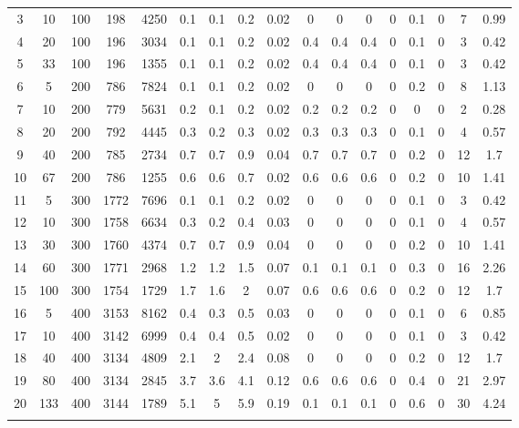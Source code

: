 \documentclass[11pt]{article}
\newcommand{\np}{\newpage}
\begin{document}
\begin{appendices}
\begin{landscape}
\begin{longtable}[c]{ccccc|cccc|cccc|cccc}
				\rowcolor[HTML]{EFEFEF} 
				3 & 10 & 100 & 198 & 4250 & 0.1 & 0.1 & 0.2 & 0.02 & 0 & 0 & 0 & 0 & 0.1 & 0 & 7 & 0.99 \\
				\rowcolor[HTML]{EFEFEF} 
				4 & 20 & 100 & 196 & 3034 & 0.1 & 0.1 & 0.2 & 0.02 & 0.4 & 0.4 & 0.4 & 0 & 0.1 & 0 & 3 & 0.42 \\
				\rowcolor[HTML]{EFEFEF} 
				5 & 33 & 100 & 196 & 1355 & 0.1 & 0.1 & 0.2 & 0.02 & 0.4 & 0.4 & 0.4 & 0 & 0.1 & 0 & 3 & 0.42 \\
				6 & 5 & 200 & 786 & 7824 & 0.1 & 0.1 & 0.2 & 0.02 & 0 & 0 & 0 & 0 & 0.2 & 0 & 8 & 1.13 \\
				7 & 10 & 200 & 779 & 5631 & 0.2 & 0.1 & 0.2 & 0.02 & 0.2 & 0.2 & 0.2 & 0 & 0 & 0 & 2 & 0.28 \\
				8 & 20 & 200 & 792 & 4445 & 0.3 & 0.2 & 0.3 & 0.02 & 0.3 & 0.3 & 0.3 & 0 & 0.1 & 0 & 4 & 0.57 \\
				9 & 40 & 200 & 785 & 2734 & 0.7 & 0.7 & 0.9 & 0.04 & 0.7 & 0.7 & 0.7 & 0 & 0.2 & 0 & 12 & 1.7 \\
				10 & 67 & 200 & 786 & 1255 & 0.6 & 0.6 & 0.7 & 0.02 & 0.6 & 0.6 & 0.6 & 0 & 0.2 & 0 & 10 & 1.41 \\
				\rowcolor[HTML]{EFEFEF} 
				11 & 5 & 300 & 1772 & 7696 & 0.1 & 0.1 & 0.2 & 0.02 & 0 & 0 & 0 & 0 & 0.1 & 0 & 3 & 0.42 \\
				\rowcolor[HTML]{EFEFEF} 
				12 & 10 & 300 & 1758 & 6634 & 0.3 & 0.2 & 0.4 & 0.03 & 0 & 0 & 0 & 0 & 0.1 & 0 & 4 & 0.57 \\
				\rowcolor[HTML]{EFEFEF} 
				13 & 30 & 300 & 1760 & 4374 & 0.7 & 0.7 & 0.9 & 0.04 & 0 & 0 & 0 & 0 & 0.2 & 0 & 10 & 1.41 \\
				\rowcolor[HTML]{EFEFEF} 
				14 & 60 & 300 & 1771 & 2968 & 1.2 & 1.2 & 1.5 & 0.07 & 0.1 & 0.1 & 0.1 & 0 & 0.3 & 0 & 16 & 2.26 \\
				\rowcolor[HTML]{EFEFEF} 
				15 & 100 & 300 & 1754 & 1729 & 1.7 & 1.6 & 2 & 0.07 & 0.6 & 0.6 & 0.6 & 0 & 0.2 & 0 & 12 & 1.7 \\
				16 & 5 & 400 & 3153 & 8162 & 0.4 & 0.3 & 0.5 & 0.03 & 0 & 0 & 0 & 0 & 0.1 & 0 & 6 & 0.85 \\
				17 & 10 & 400 & 3142 & 6999 & 0.4 & 0.4 & 0.5 & 0.02 & 0 & 0 & 0 & 0 & 0.1 & 0 & 3 & 0.42 \\
				18 & 40 & 400 & 3134 & 4809 & 2.1 & 2 & 2.4 & 0.08 & 0 & 0 & 0 & 0 & 0.2 & 0 & 12 & 1.7 \\
				19 & 80 & 400 & 3134 & 2845 & 3.7 & 3.6 & 4.1 & 0.12 & 0.6 & 0.6 & 0.6 & 0 & 0.4 & 0 & 21 & 2.97 \\
				20 & 133 & 400 & 3144 & 1789 & 5.1 & 5 & 5.9 & 0.19 & 0.1 & 0.1 & 0.1 & 0 & 0.6 & 0 & 30 & 4.24 \\ \np

\end{longtable}
\end{landscape}
\end{appendices}
\end{document}
